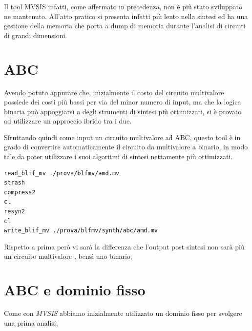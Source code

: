 \documentclass[
  italian,
]{book}
\begin{document}
Il tool MVSIS infatti, come affermato in precedenza, non è più stato sviluppato ne mantenuto. All'atto pratico si presenta infatti più lento nella sintesi ed ha una gestione della memoria che porta a dump di memoria durante l'analisi di circuiti di grandi dimensioni.

\newpage

\hypertarget{abc-2}{%
\section{ABC}\label{abc-2}}

Avendo potuto appurare che, inizialmente il costo del circuito multivalore possiede dei costi più bassi per via del minor numero di input, ma che la logica binaria può appoggiarsi a degli strumenti di sintesi più ottimizzati, si è provato ad utilizzare un approccio ibrido tra i due.

Sfruttando quindi come input un circuito multivalore ad ABC, questo tool è in grado di convertire automaticamente il circuito da multivalore a binario, in modo tale da poter utilizzare i suoi algoritmi di sintesi nettamente più ottimizzati.

\begin{verbatim}
read_blif_mv ./prova/blfmv/amd.mv
strash
compress2
cl
resyn2
cl
write_blif_mv ./prova/blfmv/synth/abc/amd.mv
\end{verbatim}

Rispetto a prima però vi sarà la differenza che l'output post sintesi non sarà più un circuito multivalore , bensì uno binario.

\hypertarget{abc-e-dominio-fisso}{%
\section{ABC e dominio fisso}\label{abc-e-dominio-fisso}}

Come con \emph{MVSIS} abbiamo inizialmente utilizzato un dominio fisso per svolgere una prima analisi.
\end{document}
